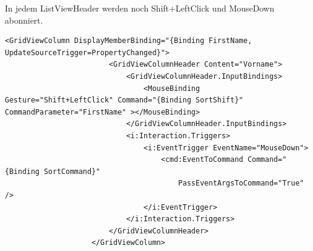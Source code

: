 In jedem ListViewHeader werden noch Shift+LeftClick und MouseDown abonniert.
\begin{lstlisting}
<GridViewColumn DisplayMemberBinding="{Binding FirstName, UpdateSourceTrigger=PropertyChanged}">
                        <GridViewColumnHeader Content="Vorname">
                            <GridViewColumnHeader.InputBindings>
                                <MouseBinding Gesture="Shift+LeftClick" Command="{Binding SortShift}" CommandParameter="FirstName" ></MouseBinding>
                            </GridViewColumnHeader.InputBindings>
                            <i:Interaction.Triggers>
                                <i:EventTrigger EventName="MouseDown">
                                    <cmd:EventToCommand Command="{Binding SortCommand}"
                                        PassEventArgsToCommand="True" />
                                </i:EventTrigger>
                            </i:Interaction.Triggers>
                        </GridViewColumnHeader>
                    </GridViewColumn>
\end{lstlisting}


